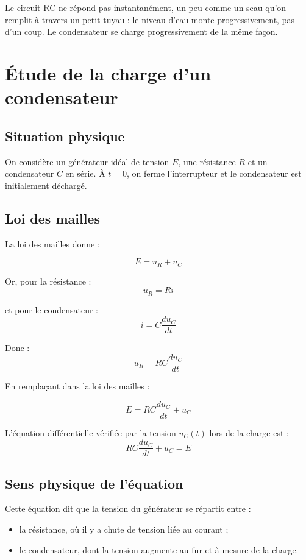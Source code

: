 \documentclass[11pt,a4paper]{article}
\begin{document}
\begin{analogie}
Le circuit RC ne répond pas instantanément, un peu comme un seau qu'on remplit à travers un petit tuyau : le niveau d'eau monte progressivement, pas d'un coup. Le condensateur se charge progressivement de la même façon.
\end{analogie}

\section{Étude de la charge d'un condensateur}

\subsection{Situation physique}

On considère un générateur idéal de tension \(E\), une résistance \(R\) et un condensateur \(C\) en série. À \(t=0\), on ferme l'interrupteur et le condensateur est initialement déchargé.

\subsection{Loi des mailles}

La loi des mailles donne :

\[
E = u_R + u_C
\]

Or, pour la résistance :
\[
u_R = Ri
\]

et pour le condensateur :
\[
i = C \frac{du_C}{dt}
\]

Donc :
\[
u_R = RC \frac{du_C}{dt}
\]

En remplaçant dans la loi des mailles :

\[
E = RC \frac{du_C}{dt} + u_C
\]

\begin{propriete}
L'équation différentielle vérifiée par la tension \(u_C(t)\) lors de la charge est :
\[
RC \frac{du_C}{dt} + u_C = E
\]
\end{propriete}

\subsection{Sens physique de l'équation}

Cette équation dit que la tension du générateur se répartit entre :
\begin{itemize}
    \item la résistance, où il y a chute de tension liée au courant ;
    \item le condensateur, dont la tension augmente au fur et à mesure de la charge.
\end{itemize}
\end{document}
